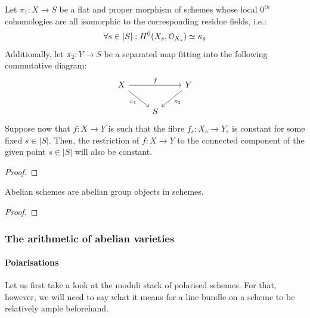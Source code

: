                 \begin{corollary} \label{coro: rigidity_theorem_2}
                    Let $\pi_1: X \to S$ be a flat and proper morphism of schemes whose local $0^{th}$ cohomologies are all isomorphic to the corresponding residue fields, i.e.:
                        $$\forall s \in |S|: H^0(X_s, \mathcal{O}_{X_s}) \simeq \kappa_s$$
                    Additionally, let $\pi_2: Y \to S$ be a separated map fitting into the following commutative diagram:
                        $$
                            \begin{tikzcd}
                            	X && Y \\
                            	& S
                            	\arrow["{\pi_1}"', from=1-1, to=2-2]
                            	\arrow["{\pi_2}", from=1-3, to=2-2]
                            	\arrow["f", from=1-1, to=1-3]
                            \end{tikzcd}
                        $$
                    Suppose now that $f: X \to Y$ is such that the fibre $f_s: X_s \to Y_s$ is constant for some fixed $s \in |S|$. Then, the restriction of $f: X \to Y$ to the connected component of the given point $s \in |S|$ will also be constant.
                \end{corollary}
                    \begin{proof}
                        
                    \end{proof}
                \begin{corollary} \label{coro: abelian_schemes_are_abelian_groups}
                    Abelian schemes are abelian group objects in schemes.
                \end{corollary}
                    \begin{proof}
                        
                    \end{proof}
                    
            \subsubsection{The arithmetic of abelian varieties}
                \paragraph{Polarisations}
                    Let us first take a look at the moduli stack of polarised schemes. For that, however, we will need to say what it means for a line bundle on a scheme to be relatively ample beforehand.
                    

